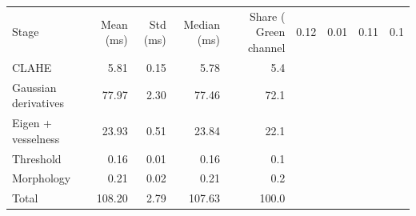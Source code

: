 \begin{tabular}{lrrrr}
\toprule
Stage & Mean (ms) & Std (ms) & Median (ms) & Share (%
\midrule
Green channel & 0.12 & 0.01 & 0.11 & 0.1 \\
CLAHE & 5.81 & 0.15 & 5.78 & 5.4 \\
Gaussian derivatives & 77.97 & 2.30 & 77.46 & 72.1 \\
Eigen + vesselness & 23.93 & 0.51 & 23.84 & 22.1 \\
Threshold & 0.16 & 0.01 & 0.16 & 0.1 \\
Morphology & 0.21 & 0.02 & 0.21 & 0.2 \\
Total & 108.20 & 2.79 & 107.63 & 100.0 \\
\bottomrule
\end{tabular}
